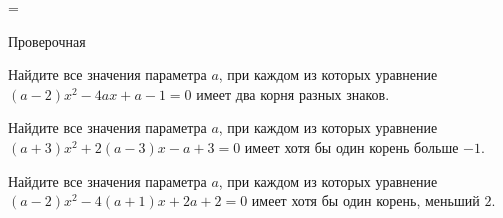 =%
\begin{exam}
	\begin{listofex}
		\item Проверочная
	\end{listofex}
\end{exam}

\begin{consultation}
	\begin{listofex}
		\item Найдите все значения параметра \( a \), при каждом из которых уравнение \( (a-2)x^2-4ax+a-1=0 \) имеет два корня разных знаков.
		\item Найдите все значения параметра \( a \), при каждом из которых уравнение \( (a+3)x^2+2(a-3)x-a+3=0 \) имеет хотя бы один корень больше \( -1 \).
		\item Найдите все значения параметра \( a \), при каждом из которых уравнение \( (a-2)x^2-4(a+1)x+2a+2=0 \) имеет хотя бы один корень, меньший \( 2 \).
	\end{listofex}
\end{consultation}
